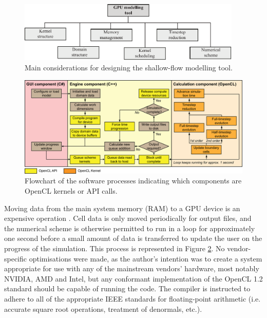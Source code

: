 \begin{figure}[tpb]
	\centering
	\includegraphics[width=0.95\textwidth]{heterogeneous-dev-figures/Figure_1_Greyscale.pdf}
	\caption{Main considerations for designing the shallow-flow modelling tool.}
	\label{ModelComponents}
\end{figure}
\begin{figure}[pb]
	\centering
	\includegraphics[width=1.0\textwidth]{heterogeneous-dev-figures/HiPIMS_Structure_NoVis.png}
	\caption{Flowchart of the software processes indicating which components are OpenCL kernels or API calls.}
	\label{HiPIMS_Structure_NoVis}
\end{figure}

Moving data from the main system memory (RAM) to a GPU device is an expensive operation \citep[see recommendations in][]{AdvancedMicroDevicesInc2011,NVIDIACorporation2010a}. Cell data is only moved periodically for output files, and the numerical scheme is otherwise permitted to run in a loop for approximately one second before a small amount of data is transferred to update the user on the progress of the simulation. This process is represented in Figure \ref{HiPIMS_Structure_NoVis}. No vendor-specific optimisations were made, as the author's intention was to create a system appropriate for use with any of the mainstream vendors' hardware, most notably NVIDIA, AMD and Intel, but any conformant implementation of the OpenCL 1.2 standard should be capable of running the code. The compiler is instructed to adhere to all of the appropriate IEEE standards for floating-point arithmetic (i.e. accurate square root operations, treatment of denormals, etc.).

